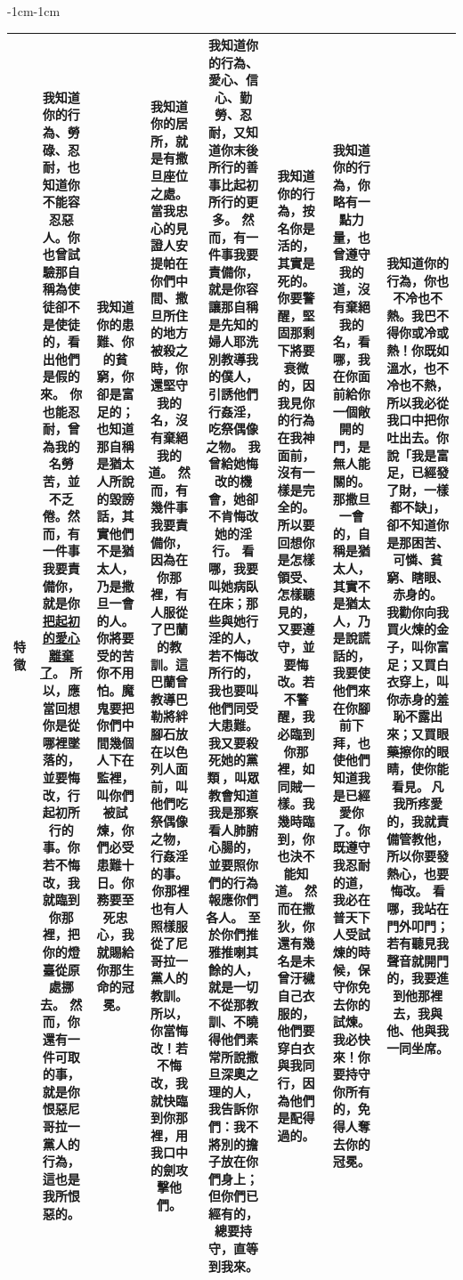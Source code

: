\begin{changemargin}{-1cm}{-1cm}
\begin{table}
\begin{tabular}{cccccccc}
 
\multicolumn{1}{m{.3cm}|}{特徵}&
\multicolumn{1}{m{3cm}|}{我知道你的行為、勞碌、忍耐，也知道你不能容忍惡人。你也曾試驗那自稱為使徒卻不是使徒的，看出他們是假的來。 你也能忍耐，曾為我的名勞苦，並不乏倦。\textbf{然而，有一件事我要責備你，就是你\underline{把起初的愛心離棄了}。 所以，應當回想你是從哪裡墜落的，並要悔改，行起初所行的事。你若不悔改，我就臨到你那裡，把你的燈臺從原處挪去。} 然而，你還有一件可取的事，就是你恨惡尼哥拉一黨人的行為，這也是我所恨惡的。}  &
 \multicolumn{1}{m{2cm}|}{我知道你的患難、你的貧窮，你卻是富足的；也知道那自稱是猶太人所說的毀謗話，其實他們不是猶太人，乃是撒旦一會的人。你將要受的苦你不用怕。魔鬼要把你們中間幾個人下在監裡，叫你們被試煉，你們必受患難十日。你務要至死忠心，我就賜給你那生命的冠冕。}&
 \multicolumn{1}{m{3cm}|}{我知道你的居所，就是有撒旦座位之處。當我忠心的見證人安提帕在你們中間、撒旦所住的地方被殺之時，你還堅守我的名，沒有棄絕我的道。 \textbf{然而，有幾件事我要責備你，因為在你那裡，有人服從了巴蘭的教訓。這巴蘭曾教導巴勒將絆腳石放在以色列人面前，叫他們吃祭偶像之物，行姦淫的事。  你那裡也有人照樣服從了尼哥拉一黨人的教訓。}所以，你當悔改！若不悔改，我就快臨到你那裡，用我口中的劍攻擊他們。 }&
 \multicolumn{1}{m{4cm}|}{我知道你的行為、愛心、信心、勤勞、忍耐，又知道你末後所行的善事比起初所行的更多。 然而，有一件事我要責備你，就是你容讓那自稱是先知的婦人耶洗別教導我的僕人，引誘他們行姦淫，吃祭偶像之物。 我曾給她悔改的機會，她卻不肯悔改她的淫行。 看哪，我要叫她病臥在床；那些與她行淫的人，若不悔改所行的，我也要叫他們同受大患難。 我又要殺死她的黨類 ，叫眾教會知道我是那察看人肺腑心腸的，並要照你們的行為報應你們各人。 至於你們推雅推喇其餘的人，就是一切不從那教訓、不曉得他們素常所說撒旦深奧之理的人，我告訴你們：我不將別的擔子放在你們身上； 但你們已經有的，總要持守，直等到我來。}&
  \multicolumn{1}{m{3cm}|}{我知道你的行為，按名你是活的，其實是死的。 你要警醒，堅固那剩下將要衰微的，因我見你的行為在我神面前，沒有一樣是完全的。所以要回想你是怎樣領受、怎樣聽見的，又要遵守，並要悔改。若不警醒，我必臨到你那裡，如同賊一樣。我幾時臨到，你也決不能知道。 然而在撒狄，你還有幾名是未曾汙穢自己衣服的，他們要穿白衣與我同行，因為他們是配得過的。 }  &
  \multicolumn{1}{m{3.6cm}|}{ 我知道你的行為，你略有一點力量，也曾遵守我的道，沒有棄絕我的名，看哪，我在你面前給你一個敞開的門，是無人能關的。 那撒旦一會的，自稱是猶太人，其實不是猶太人，乃是說謊話的，我要使他們來在你腳前下拜，也使他們知道我是已經愛你了。你既遵守我忍耐的道，我必在普天下人受試煉的時候，保守你免去你的試煉。 我必快來！你要持守你所有的，免得人奪去你的冠冕。}   & 
  \multicolumn{1}{m{3cm}|}{我知道你的行為，你也不冷也不熱。我巴不得你或冷或熱！你既如溫水，也不冷也不熱，所以我必從我口中把你吐出去。你說「我是富足，已經發了財，一樣都不缺」，卻不知道你是那困苦、可憐、貧窮、瞎眼、赤身的。 我勸你向我買火煉的金子，叫你富足；又買白衣穿上，叫你赤身的羞恥不露出來；又買眼藥擦你的眼睛，使你能看見。 凡我所疼愛的，我就責備管教他，所以你要發熱心，也要悔改。 看哪，我站在門外叩門；若有聽見我聲音就開門的，我要進到他那裡去，我與他、他與我一同坐席。 }    \\\hline



\end{tabular}
\end{table}
\end{changemargin}
